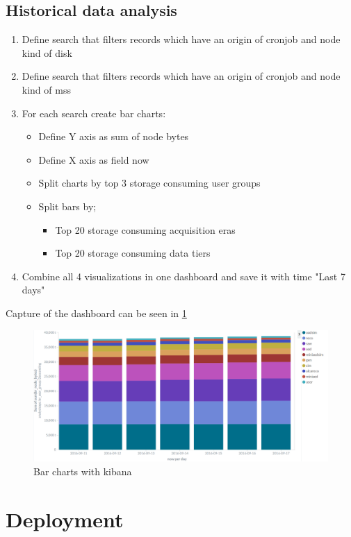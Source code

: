 \subsection{Historical data analysis}

\begin{enumerate}
\item Define search that filters records which have an origin of cronjob and node kind of disk
\item Define search that filters records which have an origin of cronjob and node kind of mss
\item For each search create bar charts:
\begin{itemize}
\item Define Y axis as sum of node bytes
\item Define X axis as field now
\item Split charts by top 3 storage consuming user groups
\item Split bars by;
\begin{itemize}
\item Top 20 storage consuming acquisition eras
\item Top 20 storage consuming data tiers
\end{itemize}
\end{itemize}
\item Combine all 4 visualizations in one dashboard and save it with time "Last 7 days"
\end{enumerate}
Capture of the dashboard can be seen in \ref{fig:bar-charts}
\begin{figure}[ht]
\begin{center}
\includegraphics[width=15cm]{bar-charts}
\caption{Bar charts with kibana}
\label{fig:bar-charts}
\end{center}
\end{figure}

\section{Deployment}

